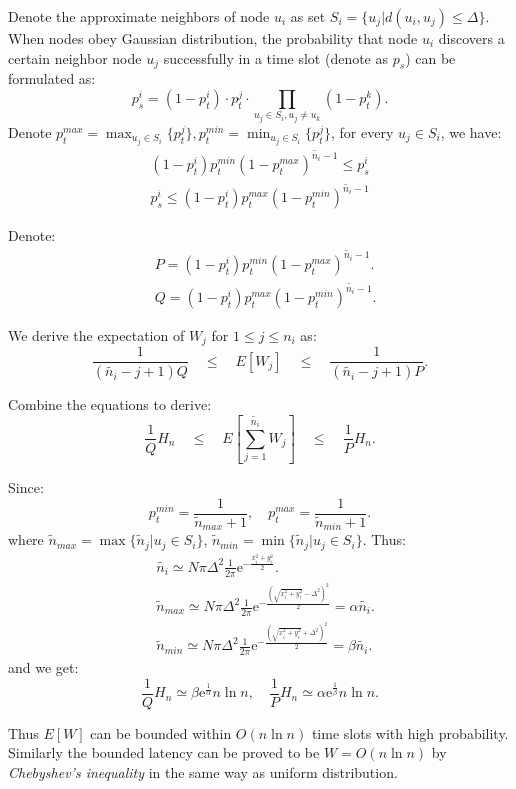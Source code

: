\begin{IEEEproof}
Denote the approximate neighbors of node $u_i$ as set $S_i = \{u_j | d(u_i, u_j) \leq \Delta \}$. When nodes obey Gaussian distribution, the probability that node $u_i$ discovers a certain neighbor node $u_{j}$ successfully in a time slot (denote as $p_{s}$) can be formulated as:
$$
p_{s}^i = (1-p_t^i) \cdot p_t^{j} \cdot \prod_{u_j \in S_i, u_j \neq u_k}(1-p_t^{k}).
$$
Denote $p_t^{max} = \max_{u_j \in S_i}\{p_t^{j}\}, p_t^{min} = \min_{u_j \in S_i}\{p_t^{j}\}$,
for every $u_j \in S_i$, we have:
\begin{equation*}
\begin{split}
(1-p_t^i)p_t^{min}{(1-p_t^{max})}^{\widetilde{n_i}-1} \leq p_{s}^i  \\ %
p_{s}^i \leq (1-p_t^i)p_t^{max}{(1-p_t^{min})}^{\widetilde{n_i}-1}
\end{split}
\end{equation*}

Denote: 
\begin{align*}
&P = (1-p_t^i)p_t^{min}{(1-p_t^{max})}^{\widetilde{n_i}-1}. \\
&Q = (1-p_t^i)p_t^{max}{(1-p_t^{min})}^{\widetilde{n_i}-1}.
\end{align*}

We derive the expectation of $W_j$ for $1 \leq j \leq n_i$ as:
$$
\frac{1}{(\widetilde{n_i}-j+1)Q} \quad \leq \quad E[W_j] \quad \leq \quad \frac{1}{(\widetilde{n_i}-j+1)P}.
$$

Combine the equations to derive:
$$
\frac{1}{Q}H_n  \quad \leq \quad E[\sum_{j=1}^{\widetilde{n_i}}W_j]  \quad \leq \quad \frac{1}{P}H_n.
$$

Since:
$$
p_t^{min} = \frac{1}{\widetilde{n}_{max}+1}, \quad p_t^{max} = \frac{1}{\widetilde{n}_{min}+1}.
$$
where $\widetilde{n}_{max} = \max\{\widetilde{n}_j | u_j\in S_i \}$, $\widetilde{n}_{min} = \min\{\widetilde{n}_j | u_j\in S_i \}$. 
Thus:
\begin{align*}
&\widetilde{n_i} \simeq N\pi \Delta^2 \frac{1}{2\pi}\mathrm{e}^{-\frac{x_i^2+y_i^2}{2}}.							\\
&\widetilde{n}_{max}  \simeq N\pi \Delta^2 \frac{1}{2\pi}\mathrm{e}^{-\frac{{(\sqrt{x_i^2+y_i^2}-\Delta^2)}^2}{2}}  = \alpha\widetilde{n_i}.\\
&\widetilde{n}_{min}  \simeq N\pi \Delta^2 \frac{1}{2\pi}\mathrm{e}^{-\frac{{(\sqrt{x_i^2+y_i^2}+\Delta^2)}^2}{2}}  = \beta\widetilde{n_i}.
\end{align*}
and we get:
$$
\frac{1}{Q}H_n \simeq \beta\mathrm{e}^{\frac{1}{\alpha}}n\ln n, \quad \frac{1}{P}H_n \simeq \alpha\mathrm{e}^{\frac{1}{\beta}}n\ln n. 
$$

Thus $E[W]$ can be bounded within $O(n\ln n)$ time slots with high probability.
Similarly the bounded latency can be proved to be $W=O(n\ln n)$ by \emph{Chebyshev's inequality} in the same way as
uniform distribution.
\end{IEEEproof}


